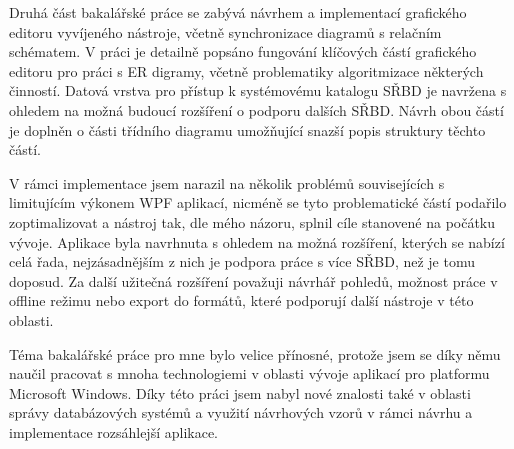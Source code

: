 \documentclass[czech,bachelor,public,dept460,male,oneside]{diploma}
\begin{document}
Druhá část bakalářské práce se zabývá návrhem a implementací grafického editoru vyvíjeného nástroje, včetně synchronizace diagramů s relačním schématem. V práci je detailně popsáno fungování klíčových částí grafického editoru pro práci s ER digramy, včetně problematiky algoritmizace některých činností. Datová vrstva pro přístup k systémovému katalogu SŘBD je navržena s ohledem na možná budoucí rozšíření o podporu dalších SŘBD. Návrh obou částí je doplněn o části třídního diagramu umožňující snazší popis struktury těchto částí.

V rámci implementace jsem narazil na několik problémů souvisejících s limitujícím výkonem WPF aplikací, nicméně se tyto problematické částí podařilo zoptimalizovat a nástroj tak, dle mého názoru, splnil cíle stanovené na počátku vývoje. Aplikace byla navrhnuta s ohledem na možná rozšíření, kterých se nabízí celá řada, nejzásadnějším z nich je podpora práce s více SŘBD, než je tomu doposud. Za další užitečná rozšíření považuji návrhář pohledů, možnost práce v offline režimu nebo export do formátů, které podporují další nástroje v této oblasti.

Téma bakalářské práce pro mne bylo velice přínosné, protože jsem se díky němu naučil pracovat s mnoha technologiemi v oblasti vývoje aplikací pro platformu Microsoft Windows. Díky této práci jsem nabyl nové znalosti také v oblasti správy databázových systémů a využití návrhových vzorů v rámci návrhu a implementace rozsáhlejší aplikace.
\end{document}
